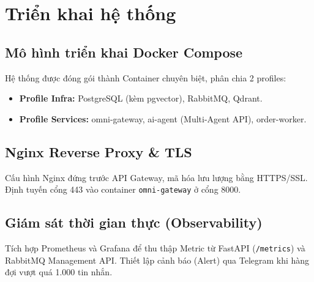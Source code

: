 \section{Triển khai hệ thống}

\subsection{Mô hình triển khai Docker Compose}
Hệ thống được đóng gói thành Container chuyên biệt, phân chia 2 profiles:
\begin{itemize}
    \item \textbf{Profile Infra:} PostgreSQL (kèm pgvector), RabbitMQ, Qdrant.
    \item \textbf{Profile Services:} omni-gateway, ai-agent (Multi-Agent API), order-worker.
\end{itemize}

\subsection{Nginx Reverse Proxy \& TLS}
Cấu hình Nginx đứng trước API Gateway, mã hóa lưu lượng bằng HTTPS/SSL. Định tuyến cổng 443 vào container \texttt{omni-gateway} ở cổng 8000.

\subsection{Giám sát thời gian thực (Observability)}
Tích hợp Prometheus và Grafana để thu thập Metric từ FastAPI (\texttt{/metrics}) và RabbitMQ Management API. Thiết lập cảnh báo (Alert) qua Telegram khi hàng đợi vượt quá 1.000 tin nhắn.
